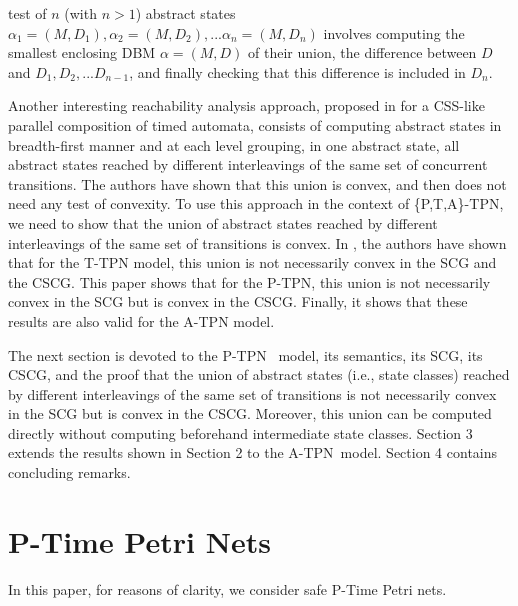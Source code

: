 \documentclass[submission,copyright,creativecommons]{eptcs}
\numberwithin{equation}{section}
\def\tapn{A-TPN}
\def\tppn{P-TPN}
\def\ttappn{\{P,T,A\}-TPN}
\begin{document}
test of $n$ (with $n>1$) abstract states $\alpha_1=(M,D_1), \alpha_2=(M,D_2),...
\alpha_n=(M,D_n)$ involves computing the smallest enclosing DBM $\alpha=(M,D)$ of their union, the
difference between $D$ and $D_1, D_2,... D_{n-1}$,
and finally checking that this difference is included in $D_n$.
\par Another interesting reachability analysis approach, proposed in \cite{Maler06} for a CSS-like parallel composition of timed automata, consists of computing abstract states in breadth-first manner and at each level grouping, in one abstract state, all abstract states reached by different interleavings of the same set of concurrent transitions. The authors have shown that this union is convex, and then does not need any test of convexity. To use this approach in the context of \ttappn, we need to show that the union of abstract states reached by different interleavings of the same set of transitions is convex. In \cite{infinity08}, the authors have shown that for the T-TPN model, this union is not necessarily convex in the SCG and the CSCG. This paper shows that for the \tppn, this union is not necessarily convex in the SCG but is convex in the CSCG. Finally, it shows that these results are also valid for the A-TPN model.
\par The next section is devoted to the \tppn~
model, its semantics, its SCG, its CSCG, and the proof that the union of abstract states (i.e., state classes) reached by different interleavings of the same set of transitions is not necessarily convex in the SCG but is convex in the CSCG. Moreover, this union can be computed directly without computing beforehand intermediate state classes. Section 3 extends the results shown in Section 2 to the \tapn~model. Section 4 contains concluding remarks.

\section{P-Time Petri Nets}
In this paper, for reasons of clarity, we consider safe P-Time Petri nets.
\end{document}
